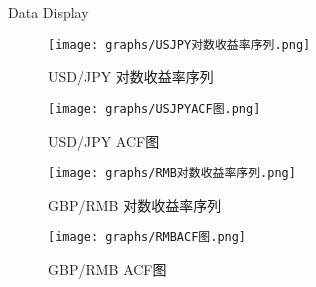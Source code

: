 \begin{frame}{Data Display}
    \begin{figure}
    \centering
    \begin{minipage}[b]{0.45\linewidth}
        \texttt{[image: graphs/USJPY对数收益率序列.png]}
        \caption{\footnotesize USD/JPY 对数收益率序列}
    \end{minipage}
    \hfill
    \begin{minipage}[b]{0.45\linewidth}
        \texttt{[image: graphs/USJPYACF图.png]}
        \caption{\footnotesize USD/JPY ACF图}
    \end{minipage}
    
    \vspace{-0.2cm}
    
    \begin{minipage}[b]{0.45\linewidth}
        \texttt{[image: graphs/RMB对数收益率序列.png]}
        \caption{\footnotesize GBP/RMB 对数收益率序列}
    \end{minipage}
    \hfill
    \begin{minipage}[b]{0.45\linewidth}
        \texttt{[image: graphs/RMBACF图.png]}
        \caption{\footnotesize GBP/RMB ACF图}
    \end{minipage}
    \end{figure}
\end{frame} 